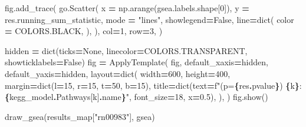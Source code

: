 \documentclass[
]{book}
\newenvironment{Shaded}{\begin{snugshade}}{\end{snugshade}}
\newcommand{\BuiltInTok}[1]{#1}
\newcommand{\DecValTok}[1]{\textcolor[rgb]{0.00,0.00,0.81}{#1}}
\newcommand{\FloatTok}[1]{\textcolor[rgb]{0.00,0.00,0.81}{#1}}
\newcommand{\NormalTok}[1]{#1}
\newcommand{\OperatorTok}[1]{\textcolor[rgb]{0.81,0.36,0.00}{\textbf{#1}}}
\newcommand{\SpecialCharTok}[1]{\textcolor[rgb]{0.81,0.36,0.00}{\textbf{#1}}}
\newcommand{\SpecialStringTok}[1]{\textcolor[rgb]{0.31,0.60,0.02}{#1}}
\newcommand{\StringTok}[1]{\textcolor[rgb]{0.31,0.60,0.02}{#1}}
\newcommand{\VariableTok}[1]{\textcolor[rgb]{0.00,0.00,0.00}{#1}}
\begin{document}
\begin{Shaded}
\begin{Highlighting}[numbers=left,,]
\NormalTok{    fig.add\_trace(}
\NormalTok{        go.Scatter(}
\NormalTok{            x }\OperatorTok{=}\NormalTok{ np.arange(gsea.labels.shape[}\DecValTok{0}\NormalTok{]),}
\NormalTok{            y }\OperatorTok{=}\NormalTok{ res.running\_sum\_statistic,}
\NormalTok{            mode }\OperatorTok{=} \StringTok{"lines"}\NormalTok{,}
\NormalTok{            showlegend}\OperatorTok{=}\VariableTok{False}\NormalTok{,}
\NormalTok{            line}\OperatorTok{=}\BuiltInTok{dict}\NormalTok{(}
\NormalTok{                color }\OperatorTok{=}\NormalTok{ COLORS.BLACK,}
\NormalTok{            ),}
\NormalTok{        ),}
\NormalTok{        col}\OperatorTok{=}\DecValTok{1}\NormalTok{, row}\OperatorTok{=}\DecValTok{3}\NormalTok{,}
\NormalTok{    )}

\NormalTok{    hidden }\OperatorTok{=} \BuiltInTok{dict}\NormalTok{(ticks}\OperatorTok{=}\VariableTok{None}\NormalTok{, linecolor}\OperatorTok{=}\NormalTok{COLORS.TRANSPARENT, showticklabels}\OperatorTok{=}\VariableTok{False}\NormalTok{)}
\NormalTok{    fig }\OperatorTok{=}\NormalTok{ ApplyTemplate(}
\NormalTok{        fig,}
\NormalTok{        default\_xaxis}\OperatorTok{=}\NormalTok{hidden,}
\NormalTok{        default\_yaxis}\OperatorTok{=}\NormalTok{hidden,}
\NormalTok{        layout}\OperatorTok{=}\BuiltInTok{dict}\NormalTok{(}
\NormalTok{            width}\OperatorTok{=}\DecValTok{600}\NormalTok{, height}\OperatorTok{=}\DecValTok{400}\NormalTok{,}
\NormalTok{            margin}\OperatorTok{=}\BuiltInTok{dict}\NormalTok{(l}\OperatorTok{=}\DecValTok{15}\NormalTok{, r}\OperatorTok{=}\DecValTok{15}\NormalTok{, t}\OperatorTok{=}\DecValTok{50}\NormalTok{, b}\OperatorTok{=}\DecValTok{15}\NormalTok{),}
\NormalTok{            title}\OperatorTok{=}\BuiltInTok{dict}\NormalTok{(text}\OperatorTok{=}\SpecialStringTok{f"(p=}\SpecialCharTok{\{}\NormalTok{res}\SpecialCharTok{.}\NormalTok{pvalue}\SpecialCharTok{\}}\SpecialStringTok{) }\SpecialCharTok{\{}\NormalTok{k}\SpecialCharTok{\}}\SpecialStringTok{:}\SpecialCharTok{\{}\NormalTok{kegg\_model}\SpecialCharTok{.}\NormalTok{Pathways[k]}\SpecialCharTok{.}\NormalTok{name}\SpecialCharTok{\}}\SpecialStringTok{"}\NormalTok{, font\_size}\OperatorTok{=}\DecValTok{18}\NormalTok{, x}\OperatorTok{=}\FloatTok{0.5}\NormalTok{),}
\NormalTok{        ),}
\NormalTok{    )}
\NormalTok{    fig.show()}

\NormalTok{draw\_gsea(results\_map[}\StringTok{"rn00983"}\NormalTok{], gsea)}
\end{Highlighting}
\end{Shaded}
\end{document}
